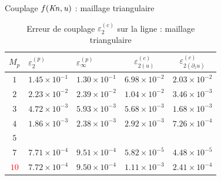 \documentclass[aspect ratio=169,t]{beamer}
\numberwithin{equation}{section} %
\begin{document}
\begin{frame}{Couplage $f(\it Kn,u)$ : maillage triangulaire}

\begin{table}[!ht]
    \centering
    \begin{tabular}{c|ll|cc}
    \hline
    $M_p$ & $\varepsilon_{2}^{(p)}$ & $\varepsilon_{\infty}^{(p)}$  &$\varepsilon_{2 {(u)}}^{(c)}$&$\varepsilon_{2 {(\partial_z u)}}^{(c)}$ \\
    \hline
    $1$ & $1.45\times 10^{-1}$ & $1.30\times 10^{-1}$ &  $6.98\times 10^{-2}$  & $2.03\times 10^{-2}$ \\
    $2$ & $2.23\times 10^{-2}$ & $2.39\times 10^{-2}$ &  $1.04\times 10^{-2}$  & $3.46\times 10^{-3}$ \\
    $3$ & $4.72\times 10^{-3}$ & $5.93\times 10^{-3}$ &  $5.68\times 10^{-3}$  & $1.68\times 10^{-3}$ \\
    $4$ & $1.86\times 10^{-3}$ & $2.38\times 10^{-3}$ &  $2.92\times 10^{-3}$  & $7.26\times 10^{-4}$ \\
    $5$ &  &  &    &  \\
    $7$ & $7.71\times 10^{-4}$ & $9.51\times 10^{-4}$ &  $5.82\times 10^{-5}$  & $4.48\times 10^{-5}$ \\
    \textcolor{red}{$10$} & $7.72\times 10^{-4}$ & $9.50\times 10^{-4}$ &  $1.11\times 10^{-3}$ & $2.41\times 10^{-4}$ \\
    \hline
    \end{tabular}
    \caption{Erreur de couplage $\varepsilon_{2}^{(c)}$ sur la ligne : maillage triangulaire}
    \label{tab:ml_slip_coupling_uns_triangle}
\end{table}

\end{frame}
\end{document}
